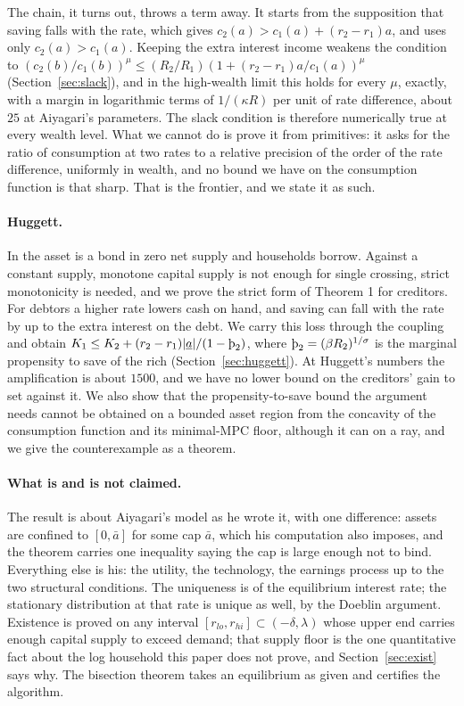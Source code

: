 The chain, it turns out, throws a term away. It starts from the supposition that saving falls with
the rate, which gives $c_2(a)>c_1(a)+(r_2-r_1)a$, and uses only $c_2(a)>c_1(a)$. Keeping the extra
interest income weakens the condition to $(c_2(b)/c_1(b))^\mu\le
(R_2/R_1)(1+(r_2-r_1)a/c_1(a))^\mu$ (Section~\ref{sec:slack}), and in the high-wealth limit this
holds for every $\mu$, exactly, with a margin in logarithmic terms of $1/(\kappa R)$ per unit of
rate difference, about $25$ at Aiyagari's parameters. The slack condition is therefore numerically
true at every wealth level. What we cannot do is prove it from primitives: it asks for the ratio of
consumption at two rates to a relative precision of the order of the rate difference, uniformly in
wealth, and no bound we have on the consumption function is that sharp. That is the frontier, and
we state it as such.

\paragraph{Huggett.}
In \citet{Huggett1993} the asset is a bond in zero net supply and households borrow. Against a
constant supply, monotone capital supply is not enough for single crossing, strict monotonicity is
needed, and we prove the strict form of Theorem 1 for creditors. For debtors a higher rate lowers
cash on hand, and saving can fall with the rate by up to the extra interest on the debt. We carry
this loss through the coupling and obtain $K_1\le K_2+(r_2-r_1)|\underline a|/(1-\Thorn_2)$, where
$\Thorn_2=(\beta R_2)^{1/\sigma}$ is the marginal propensity to save of the rich
(Section~\ref{sec:huggett}). At Huggett's numbers the amplification is about $1500$, and we have no
lower bound on the creditors' gain to set against it. We also show that the propensity-to-save
bound the argument needs cannot be obtained on a bounded asset region from the concavity of the
consumption function and its minimal-MPC floor, although it can on a ray, and we give the
counterexample as a theorem.

\paragraph{What is and is not claimed.}
The result is about Aiyagari's model as he wrote it, with one difference: assets are confined to
$[0,\bar a]$ for some cap $\bar a$, which his computation also imposes, and the theorem carries one
inequality saying the cap is large enough not to bind. Everything else is his: the utility, the
technology, the earnings process up to the two structural conditions. The uniqueness is of the
equilibrium interest rate; the stationary distribution at that rate is unique as well, by the
Doeblin argument. Existence is proved on any interval $[r_{lo},r_{hi}]\subset(-\delta,\lambda)$
whose upper end carries enough capital supply to exceed demand; that supply floor is the one
quantitative fact about the log household this paper does not prove, and Section~\ref{sec:exist}
says why. The bisection theorem takes an equilibrium as given and certifies the algorithm.

